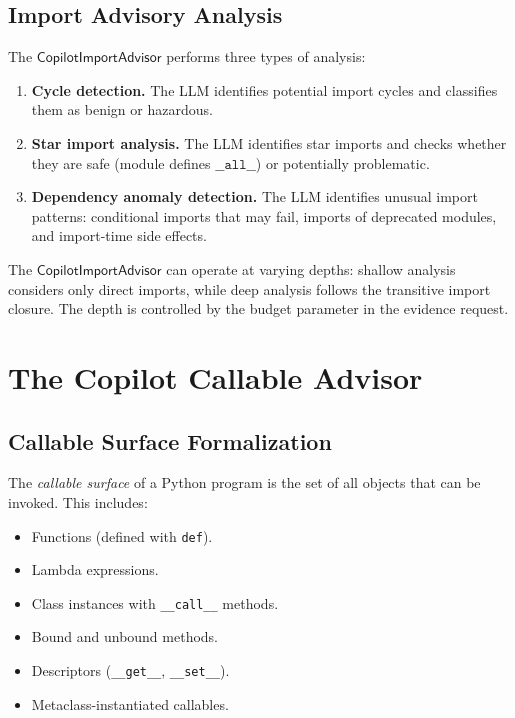 \documentclass[11pt]{article}
\newcommand{\ImportAdv}{\mathsf{CopilotImportAdvisor}}
\begin{document}
\subsection{Import Advisory Analysis}
\label{sec:import:analysis}

The $\ImportAdv$ performs three types of analysis:

\begin{enumerate}
\item \textbf{Cycle detection.}  The LLM identifies potential
  import cycles and classifies them as benign or hazardous.

\item \textbf{Star import analysis.}  The LLM identifies star
  imports and checks whether they are safe (module defines
  $\texttt{\_\_all\_\_}$) or potentially problematic.

\item \textbf{Dependency anomaly detection.}  The LLM identifies
  unusual import patterns: conditional imports that may fail,
  imports of deprecated modules, and import-time side effects.
\end{enumerate}

\begin{remark}
\label{rem:import-depth}
The $\ImportAdv$ can operate at varying depths: shallow analysis
considers only direct imports, while deep analysis follows the
transitive import closure.  The depth is controlled by the
budget parameter in the evidence request.
\end{remark}

\section{The Copilot Callable Advisor}
\label{sec:callable}

\subsection{Callable Surface Formalization}
\label{sec:callable:surface}

\begin{definition}
\label{def:callable-surface}
The \emph{callable surface} of a Python program is the set of
all objects that can be invoked.  This includes:
\begin{itemize}[leftmargin=2em]
\item Functions (defined with \texttt{def}).
\item Lambda expressions.
\item Class instances with \texttt{\_\_call\_\_} methods.
\item Bound and unbound methods.
\item Descriptors (\texttt{\_\_get\_\_}, \texttt{\_\_set\_\_}).
\item Metaclass-instantiated callables.
\end{itemize}
\end{definition}
\end{document}
